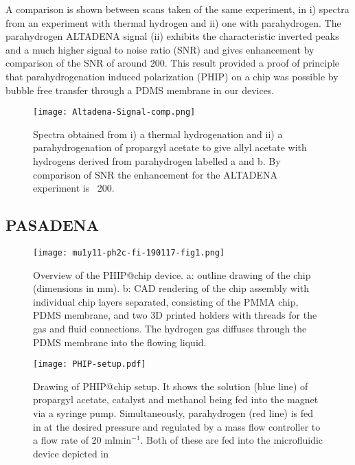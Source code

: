 A comparison is shown between scans taken of the same experiment, in  i) spectra
from an experiment with thermal hydrogen and ii) one with parahydrogen. The parahydrogen
ALTADENA signal (ii) exhibits the characteristic inverted peaks and a much higher signal
to noise ratio (SNR) and gives enhancement by comparison of the SNR of around 200.
This result provided a proof of principle that parahydrogenation induced polarization (PHIP) on a chip
was possible by bubble free transfer through a PDMS membrane in our devices.

\begin{figure}[h]
  \begin{center}
  \texttt{[image: Altadena-Signal-comp.png]}
  \end{center}
  \caption{Spectra obtained from i) a thermal hydrogenation and ii) a parahydrogenation
  of propargyl acetate to give allyl acetate with hydrogens derived from parahydrogen labelled a and
  b. By comparison of SNR the enhancement for the ALTADENA experiment is ~200. }
  \label{fig:AltadenaResults}
\end{figure}

\newpage

\subsection{PASADENA}

\begin{figure}[h!]
	\centering
	\texttt{[image: mu1y11-ph2c-fi-190117-fig1.png]}
	\caption{Overview of the PHIP@chip device.
    a: outline drawing of the chip (dimensions in mm).
		b: CAD rendering of the chip assembly with individual chip layers
		separated, consisting of the PMMA chip, PDMS membrane, and two 3D
		printed holders with threads for the gas and fluid connections.
    The hydrogen gas
		diffuses through the PDMS membrane into the flowing liquid.
		}
	\label{fig:phip@chip1}
\end{figure}

\begin{figure}
  \begin{center}
  \texttt{[image: PHIP-setup.pdf]}
  \end{center}
  \caption{Drawing of PHIP@chip setup. It shows the solution (blue line)
  of propargyl acetate, catalyst and methanol being fed into the magnet
  via a syringe pump. Simultaneously, parahydrogen (red line) is fed in
  at the desired pressure and regulated by a mass flow controller to a
  flow rate of 20 ml$\text{min}^{-1}$. Both of these are fed into the
  microfluidic device depicted in }
  \label{fig:SetUp}
\end{figure}

